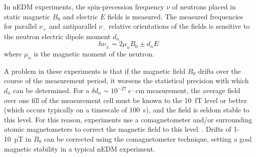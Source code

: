 \documentclass[review]{elsarticle}
\begin{document}

In nEDM experiments, the spin-precession frequency $\nu$ of neutrons
placed in static magnetic $B_0$ and electric $E$ fields is measured.
The measured frequencies for parallel $\nu_+$ and antiparallel $\nu_-$
relative orientations of the fields is sensitive to the neutron
electric dipole moment $d_n$
\begin{equation}
h\nu_\pm=2\mu_nB_0\pm d_nE
\end{equation}
where $\mu_n$ is the magnetic moment of the neutron.






A problem in these experiments is that if the magnetic field $B_0$
drifts over the course of the measurement period, it worsens the
statistical precision with which $d_n$ can be determined.  For a
$\delta d_n\sim 10^{-27}~e\cdot$cm measurement, the average field over
one fill of the measurement cell must be known to the 10~fT level or
better (which occurs typically on a timescale of 100~s), and the field
is seldom stable to this level.  For this reason, experiments use a
comagnetometer and/or surrounding atomic magnetometers to correct the
magnetic field to this level~\cite{bib:nedm4,bib:afach,bib:brys}.
Drifts of 1-10~pT in $B_0$ can be corrected using the comagnetometer
technique, setting a goal magnetic stability in a typical nEDM
experiment.
\end{document}
